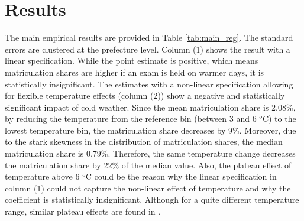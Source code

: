 \documentclass[12pt,letterpaper]{article}
\begin{document}

\section{Results}\label{sec:results}

The main empirical results are provided in Table \ref{tab:main_reg}.
The standard errors are clustered at the prefecture level.
Column (1) shows the result with a linear specification.
While the point estimate is positive, which means matriculation shares are higher if an exam is held on warmer days, it is statistically insignificant. 
The estimates with a non-linear specification allowing for flexible temperature effects (column (2)) show a negative and statistically significant impact of cold weather. 
Since the mean matriculation share is $2.08$\%, by reducing the temperature from the reference bin (between 3 and 6 $^o$C) to the lowest temperature bin, the matriculation share decreases by 9\%.
Moreover, due to the stark skewness in the distribution of matriculation shares, the median matriculation share is $0.79$\%.
Therefore, the same temperature change decreases the matriculation share by 22\% of the median value.
Also, the plateau effect of temperature above 6 $^o$C could be the reason why the linear specification in column (1) could not capture the non-linear effect of temperature and why the coefficient is statistically insignificant.
Although for a quite different temperature range, similar plateau effects are found in \citet{Park2020a}.
\end{document}
